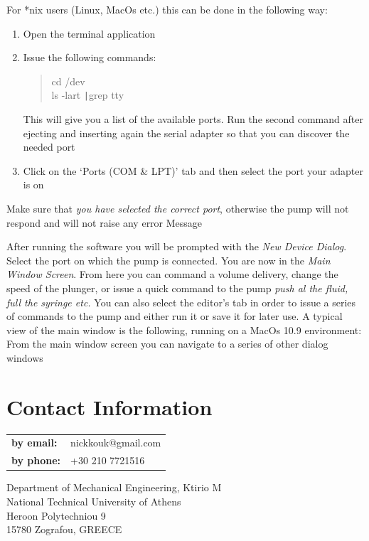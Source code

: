 \documentclass[a4paper]{article}
\newcommand{\faculty}{Department of Mechanical Engineering, Ktirio M\\
National Technical University of Athens\\
Heroon Polytechniou 9\\
15780 Zografou, GREECE\\}
\begin{document}
For *nix users (Linux, MacOs etc.) this can be done in the following way:
\begin{enumerate}
    \item Open the terminal application
    \item Issue the following commands:
        \begin{quote}
            cd /dev\\
            ls -lart \verb+|+grep tty\\
        \end{quote}
        This will give you a list of the available ports.
        Run the second command after ejecting and inserting again the serial adapter 
        so that you can discover the needed port
    \item Click on the `Ports (COM \& LPT)' tab and then select the port your adapter is on
\end{enumerate}
Make sure that \emph{you have selected the correct port}, otherwise the pump will not respond and will
not raise any error Message

After running the software you will be prompted with the \emph{New Device Dialog}.
Select the port on which the pump is connected.
You are now in the \emph{Main Window Screen}. From here you can command a volume delivery,
change the speed of the plunger, or issue a quick command to the pump 
\textit{push al the fluid, full the syringe etc.}
You can also select the editor's tab in order to issue a series of commands to the pump 
and either run it or save it for later use.
A typical view of the main window is the following, running on a MacOs 10.9 environment:
From the main window screen you can navigate to a series of other dialog windows

\section{Contact Information}

\begin{tabular}{ll}
    \textbf{by email:} & nickkouk@gmail.com\\
    \textbf{by phone:} & +30 210 7721516\\
\end{tabular}

\vspace{2 mm}
\faculty
\end{document}
